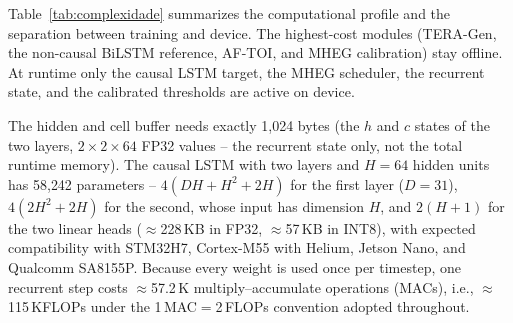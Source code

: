 \documentclass[a4paper,fleqn]{cas-dc}
\newcommand{\TERAGen}{\mbox{TERA-Gen}\xspace}
\newcommand{\AFTOI}{\mbox{AF-TOI}\xspace}
\newcommand{\MHEG}{\mbox{MHEG}\xspace}
\begin{document}
Table~\ref{tab:complexidade} summarizes the computational profile and the
separation between training and device. The highest-cost modules (\TERAGen, the
non-causal BiLSTM reference, \AFTOI, and \MHEG calibration) stay offline. At
runtime only the causal LSTM target, the \MHEG scheduler, the recurrent state,
and the calibrated thresholds are active on device.

The hidden and cell buffer needs exactly 1,024 bytes {\color{\revcolor}(the $h$ and $c$ states of the two layers, $2 \times 2 \times 64$ FP32 values -- the recurrent state only, not the total runtime memory)}. The causal
LSTM with two layers and $H{=}64$ hidden units has {\color{\revcolor}58{,}242
parameters -- $4(DH{+}H^2{+}2H)$ for the first layer ($D{=}31$),
$4(2H^2{+}2H)$ for the second, whose input has dimension $H$, and $2(H{+}1)$
for the two linear heads} ($\approx$228\,KB in FP32, $\approx$57\,KB in INT8),
with expected compatibility with STM32H7, Cortex-M55 with Helium, Jetson Nano,
and Qualcomm SA8155P. {\color{\revcolor}Because every weight is used once per
timestep, one recurrent step costs $\approx$57.2\,K multiply--accumulate
operations (MACs), i.e., $\approx$115\,KFLOPs under the 1\,MAC${}={}$2\,FLOPs
convention adopted throughout.}
\end{document}
